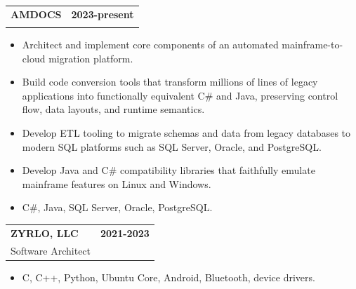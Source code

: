 \documentclass[11pt]{article}
\makeatletter
\newcommand{\IF}[2]{\iftoggle{#1}{#2}{}}
\newcommand{\IFELSE}[3]{\iftoggle{#1}{#2}{#3}}
\newcommand{\jobheading}[4]{%
  \vspace{5.6pt}\begin{tabularx}{\textwidth}{@{}X r@{}}
    {\textbf{#1}} & {\textbf{#2}} \\
    {{\normalsize #3}\hspace{0.5em}{\color{muted}·}\hspace{0.5em}{\color{muted}#4}} & {} \\
  \end{tabularx}\vspace{2pt}
}
\makeatother
\begin{document}
\jobheading{AMDOCS}{2023-present}{\IFELSE{MF}{Mainframe Modernization Engineer}{Cloud Migration Engineer, Platform \& Tooling}}{Remote}
\begin{itemize}
\item Architect and implement core components of an automated mainframe-to-cloud migration platform.
\item Build code conversion tools that transform millions of lines of legacy \IF{MF}{COBOL, JCL, and CICS }applications into functionally equivalent C\# and Java, preserving control flow, data layouts, and runtime semantics.
\item Develop ETL tooling to migrate schemas and data from legacy databases\IF{MF}{ (DB2, ADABAS, IDMS)} to modern SQL platforms such as SQL Server, Oracle, and PostgreSQL.
\item Develop Java and C\# compatibility libraries that faithfully emulate mainframe features on Linux and Windows.
\item C\#, Java, SQL Server, Oracle, PostgreSQL.
\end{itemize}

\jobheading{ZYRLO, LLC}{2021-2023}{Software Architect}{Sudbury, MA}
\begin{itemize}
\IFELSE{EMBEDDED}{%
\item Defined the software architecture and implemented core system components for an assistive device for visually impaired users.
\item Architected and built the software stack around the main CM4 controller running Ubuntu Core, with an SD410/Android subsystem for braille and accessibility, and ESP32 firmware.
\item Implemented the key software/hardware interfaces across the product stack, including custom protocols, Bluetooth, Android integration, and Linux drivers.
\item Worked with hardware engineers on schematic reviews, board bring-up, and hardware/software debugging, including bootloader configuration and driver integration.
}{%
\item Architected the software stack for an assistive device spanning CM4/Ubuntu Core, an SD410/Android subsystem for braille and accessibility, and ESP32 firmware.
\item Implemented the key software and hardware interfaces across the product stack, including custom protocols, Bluetooth, Android integration, and Linux drivers.
}%
\item C, C++, Python, Ubuntu Core, Android, Bluetooth, device drivers.
\end{itemize}
\end{document}
